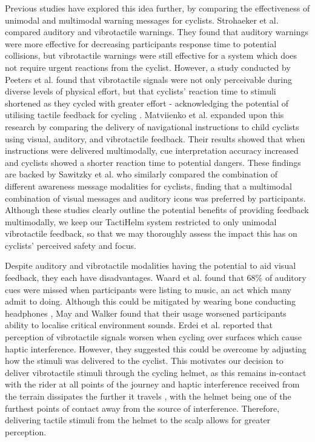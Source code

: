 \documentclass{mpaper}
\begin{document}
Previous studies have explored this idea further, by comparing the effectiveness of unimodal and multimodal warning messages for cyclists. Strohaeker et al. \cite{STROHAEKER2022151} compared auditory and vibrotactile warnings. They found that auditory warnings were more effective for decreasing participants response time to potential collisions, but vibrotactile warnings were still effective for a system which does not require urgent reactions from the cyclist. However, a study conducted by Peeters et al. found that vibrotactile signals were not only perceivable during diverse levels of physical effort, but that cyclists' reaction time to stimuli shortened as they cycled with greater effort - acknowledging the potential of utilising tactile feedback for cycling \cite{peeters2019vibrotactile}. Matviienko et al. \cite{10.1145/3290605.3300850, 10.1145/3229434.3229479} expanded upon this research by comparing the delivery of navigational instructions to child cyclists using visual, auditory, and vibrotactile feedback. Their results showed that when instructions were delivered multimodally, cue interpretation accuracy increased and cyclists showed a shorter reaction time to potential dangers. These findings are backed by Sawitzky et al. \cite{10.1145/3490099.3511127, mti6010003} who similarly compared the combination of different awareness message modalities for cyclists, finding that a multimodal combination of visual messages and auditory icons was preferred by participants. 
Although these studies clearly outline the potential benefits of providing feedback multimodally, we keep our TactiHelm system restricted to only unimodal vibrotactile feedback, so that we may thoroughly assess the impact this has on cyclists' perceived safety and focus.

Despite auditory and vibrotactile modalities having the potential to aid visual feedback, they each have disadvantages. Waard et al. \cite{DEWAARD2011626} found that 68\% of auditory cues were missed when participants were listing to music, an act which many admit to doing. Although this could be mitigated by wearing bone conducting headphones \cite{wolfe2016distracted}, May and Walker \cite{may2017effects} found that their usage worsened participants ability to localise critical environment sounds. Erdei et al. \cite{erdei2020comparing, doi:10.1080/15389588.2021.1985113} reported that perception of vibrotactile signals worsen when cycling over surfaces which cause haptic interference. However, they suggested this could be overcome by adjusting how the stimuli was delivered to the cyclist. This motivates our decision to deliver vibrotactile stimuli through the cycling helmet, as this remains in-contact with the rider at all points of the journey and haptic interference received from the terrain dissipates the further it travels \cite{9415164}, with the helmet being one of the furthest points of contact away from the source of interference. Therefore, delivering tactile stimuli from the helmet to the scalp allows for greater perception.
\end{document}
